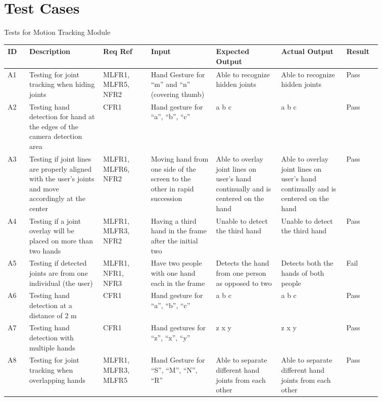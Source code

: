 \documentclass[12pt, titlepage]{article}
\begin{document}
\section{Test Cases}

\newpage
\centerline{Tests for Motion Tracking Module}

\renewcommand{\arraystretch}{1.2}
\noindent \begin{longtable}{p{0.05\linewidth}|p{0.17\linewidth}|p{0.11\linewidth}|p{0.15\linewidth}|p{0.15\linewidth}|p{0.15\linewidth}|p{0.08\linewidth}}
\hline
\textbf{ID} & \textbf{Description} & \textbf{Req Ref} & \textbf{Input} & \textbf{Expected Output} & \textbf{Actual Output} & \textbf{Result}\\
\hline
A1 & Testing for joint tracking when hiding joints & MLFR1, MLFR5, NFR2 & Hand Gesture for “m” and “n” (covering thumb) & Able to recognize hidden joints & Able to recognize hidden joints & Pass\\ \hline
A2 & Testing hand detection for hand at the edges of the camera detection area & CFR1 & Hand gesture for “a”, “b”, “c” & a b c & a b c & Pass\\ \hline
A3 & Testing if joint lines are properly aligned with the user’s joints and move accordingly at the center & MLFR1, MLFR6, NFR2 & Moving hand from one side of the screen to the other in rapid succession & Able to overlay joint lines on user’s hand continually and is centered on the hand & Able to overlay joint lines on user’s hand continually and is centered on the hand & Pass\\ \hline
A4 & Testing if a joint overlay will be placed on more than two hands & MLFR1, MLFR3, NFR2 & Having a third hand in the frame after the initial two & Unable to detect the third hand & Unable to detect the third hand & Pass\\ \hline
A5 & Testing if detected joints are from one individual (the user) & MLFR1, NFR1, NFR3 & Have two people with one hand each in the frame & Detects the hand from one person as opposed to two & Detects both the hands of both people & Fail\\ \hline
A6 & Testing hand detection at a distance of 2 m & CFR1 & Hand gesture for “a”, “b”, “c” & a b c & a b c & Pass\\ \hline
A7 & Testing hand detection with multiple hands & CFR1 & Hand gestures for “z”, “x”, “y” & z x y & z x y & Pass\\ \hline
A8 & Testing for joint tracking when overlapping hands & MLFR1, MLFR3, MLFR5 & Hand Gesture for “S”, “M”, “N”, “R” & Able to separate different hand joints from each other & Able to separate different hand joints from each other & Pass\\ \hline

\end{longtable}
\end{document}
